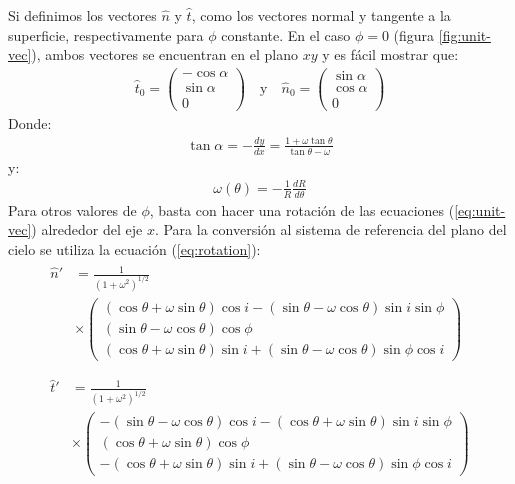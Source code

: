 Si definimos los vectores $\hat{n}$ y $\hat{t}$, como los vectores normal y tangente a la superficie, respectivamente para $\phi$ constante. En el caso $\phi = 0$ (figura \ref{fig:unit-vec}), ambos vectores se encuentran en el plano $xy$ y es fácil mostrar que:
\begin{align}
  \hat{t}_0 =
  \left(
  \begin{array}{c}
    -\cos\alpha \\
    \sin\alpha \\
    0
  \end{array}
  \right)
  \quad \mathrm{y} \quad
  \hat{n}_0 =
  \left(
  \begin{array}{c}
    \sin\alpha \\
    \cos\alpha \\
    0
  \end{array}
  \right)
  \label{eq:unit-vec}
\end{align}
Donde:
\begin{align}
  \tan\alpha = -\frac{dy}{dx} = \frac{1+\omega\tan\theta}{\tan\theta-\omega}
\end{align}
y:
\begin{align}
  \omega(\theta) = -\frac{1}{R}\frac{dR}{d\theta} 
\end{align}
Para otros valores de $\phi$, basta con hacer una rotación de las ecuaciones (\ref{eq:unit-vec}) alrededor del eje $x$. Para la conversión al sistema de referencia del plano del cielo se utiliza la ecuación (\ref{eq:rotation}):
\begin{align}
\begin{split}
  \hat{n}' &= \frac{1}{\left(1 + \omega^2\right)^{1/2}} \\
           & \times \left(
             \begin{array}{c}
               (\cos\theta+\omega\sin\theta)\cos i-(\sin\theta-\omega\cos\theta)\sin i\sin\phi\\
               (\sin\theta-\omega\cos\theta)\cos\phi \\
               (\cos\theta+\omega\sin\theta)\sin i+(\sin\theta-\omega\cos\theta)\sin\phi\cos i
             \end{array}
                    \right) \\
\end{split}\\
\begin{split}
    \hat{t}' &= \frac{1}{\left(1 + \omega^2\right)^{1/2}} \\
           & \times \left(
             \begin{array}{c}
               -(\sin\theta-\omega\cos\theta)\cos i-(\cos\theta+\omega\sin\theta)\sin i\sin\phi\\
               (\cos\theta+\omega\sin\theta)\cos\phi \\
               -(\cos\theta+\omega\sin\theta)\sin i+(\sin\theta-\omega\cos\theta)\sin\phi\cos i
             \end{array}
             \right)
\end{split} 
\end{align}


